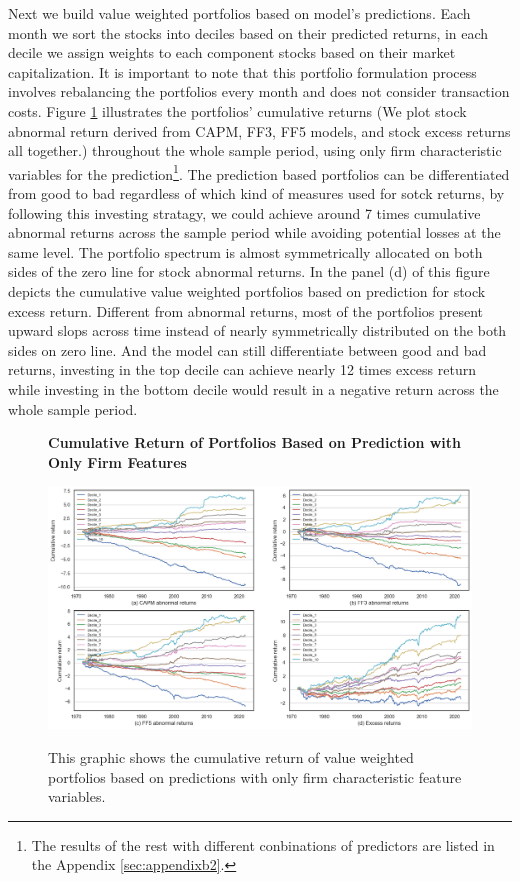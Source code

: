 Next we build value weighted portfolios based on model's predictions. Each month we sort the stocks into deciles based on their predicted returns, in each decile we assign weights to each component stocks based on their market capitalization. It is important to note that this portfolio formulation process involves rebalancing the portfolios every month and does not consider transaction costs. Figure \ref{fig: portfolios cum return firm features} illustrates the portfolios' cumulative returns (We plot stock abnormal return derived from CAPM, FF3, FF5 models, and stock excess returns all together.) throughout the whole sample period, using only firm characteristic variables for the prediction\footnote{The results of the rest with different conbinations of predictors are listed in the Appendix \ref{sec:appendixb2}.}. The prediction based portfolios can be differentiated from good to bad regardless of which kind of measures used for sotck returns, by following this investing stratagy, we could achieve around 7 times cumulative abnormal returns across the sample period while avoiding potential losses at the same level. The portfolio spectrum is almost symmetrically allocated on both sides of the zero line for stock abnormal returns. In the panel (d) of this figure depicts the cumulative value weighted portfolios based on prediction for stock excess return. Different from abnormal returns, most of the portfolios present upward slops across time instead of nearly symmetrically distributed on the both sides on zero line. And the model can still differentiate between good and bad returns, investing in the top decile can achieve nearly 12 times excess return while investing in the bottom decile would result in a negative return across the whole sample period.

\begin{figure}[H]
  \centering
  \caption{\textbf{Cumulative Return of Portfolios Based on Prediction with Only Firm Features}}
  \includegraphics[width=.8\textwidth]{images/vw_portfolios_cumulative_return_firm.png}
  \label{fig: portfolios cum return firm features}
  \caption*{\footnotesize{This graphic shows the cumulative return of value weighted portfolios based on predictions with only firm characteristic feature variables.}}
\end{figure}

